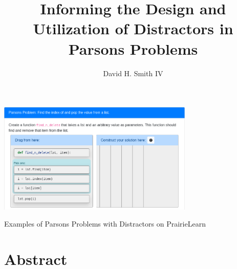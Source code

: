 \documentclass[authorversion,nonacm]{acmart}
\begin{document}


\title{Informing the Design and Utilization of Distractors in Parsons Problems}

\author{David H. Smith IV}


\begin{teaserfigure}
    \centering
    \includegraphics[width=0.70\textwidth]{imgs/parsons.png}
    \caption{Examples of Parsons Problems with Distractors on PrairieLearn}
\end{teaserfigure}

\maketitle

\section{Abstract}
\end{document}
